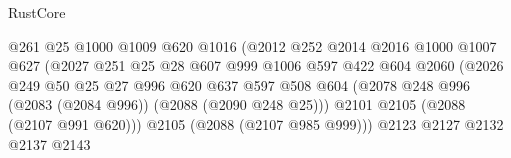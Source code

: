 \begin{lexlean}{RustCore}
\begin{coremodule}
                                          @261
                                          @25
                                          @1000
                                          @1009
                                          @620
                                          @1016
                                          (@2012
                                            @252
                                            @2014
                                            @2016
                                            @1000
                                            @1007
                                            @627
                                            (@2027
                                              @251
                                              @25
                                              @28
                                              @607
                                              @999
                                              @1006
                                              @597
                                              @422
                                              @604
                                              @2060
                                              (@2026
                                                @249
                                                @50
                                                @25
                                                @27
                                                @996
                                                @620
                                                @637
                                                @597
                                                @508
                                                @604
                                                (@2078
                                                  @248
                                                  @996
                                                  (@2083 (@2084 @996))
                                                  (@2088 (@2090 @248 @25)))
                                                @2101
                                                @2105
                                                (@2088 (@2107 @991 @620)))
                                              @2105
                                              (@2088 (@2107 @985 @999)))
                                            @2123
                                            @2127
                                            @2132
                                            @2137
                                            @2143

\end{coremodule}
\end{lexlean}
